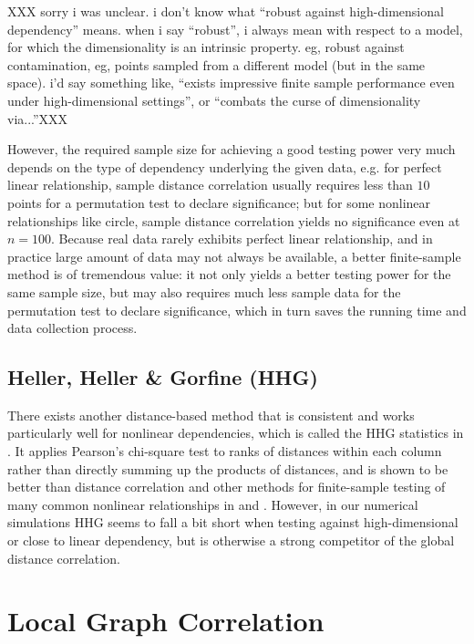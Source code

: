 \documentclass[11pt]{article}
\begin{document}
XXX sorry i was unclear.  i don't know what ``robust against high-dimensional dependency'' means. when i say ``robust'', i always mean with respect to a model, for which the dimensionality is an intrinsic property.  eg, robust against contamination, eg, points sampled from a different model (but in the same space). i'd say something like, ``exists impressive finite sample performance even under high-dimensional settings'', or ``combats the curse of dimensionality via...''XXX

However, the required sample size for achieving a good testing power very much depends on the type of dependency underlying the given data, e.g. for perfect linear relationship, sample distance correlation usually requires less than $10$ points for a permutation test to declare significance; but for some nonlinear relationships like circle, sample distance correlation yields no significance even at $n=100$. Because real data rarely exhibits perfect linear relationship, and in practice large amount of data may not always be available, a better finite-sample method is of tremendous value: it not only yields a better testing power for the same sample size, but may also requires much less sample data for the permutation test to declare significance, which in turn saves the running time and data collection process. 


\subsection{Heller, Heller \& Gorfine (HHG)}
\label{sec:hhg}


There exists another distance-based method that is consistent and works particularly well for nonlinear dependencies, which is called the HHG statistics in \cite{HellerGorfine2013}. It applies Pearson's chi-square test to ranks of distances within each column rather than directly summing up the products of distances, and is shown to be better than distance correlation and other methods for finite-sample testing of many common nonlinear relationships in \cite{GorfineHellerHeller2012} and \cite{HellerGorfine2013}. However, in our numerical simulations HHG seems to fall a bit short when testing against high-dimensional or close to linear dependency, but is otherwise a strong competitor of the global distance correlation. 


\section{Local Graph Correlation}
\label{main2}
\end{document}
